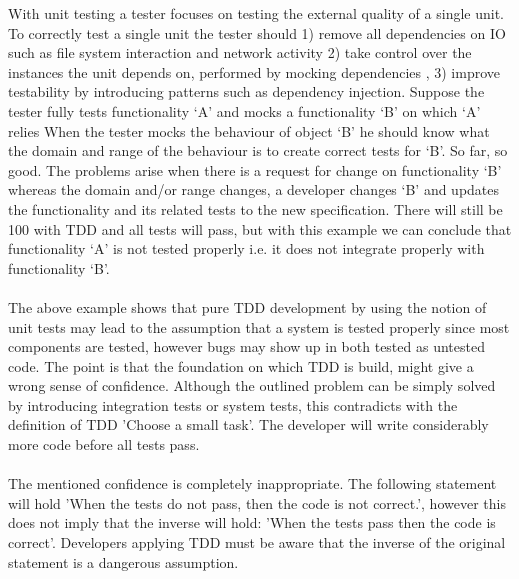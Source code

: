 \begin{itshape}
\begin{addmargin}[1em]{1em}
With unit testing a tester focuses on testing the external quality of a single unit. To correctly test a single unit
the tester should 1) remove all dependencies on IO such as file system interaction and network activity 2) take
control over the instances the unit depends on, performed by mocking dependencies \autocite{XP_EXAMINED}, 3) improve
testability by introducing patterns such as dependency injection. Suppose the
tester fully tests functionality `A' and mocks a functionality `B' on which `A' relies When the tester
mocks the behaviour of object `B' he should know what the domain and range of the behaviour is to create correct
tests for `B'. So far, so good. The problems arise when there is a request for change on functionality `B'
whereas the domain and/or range changes, a developer changes `B' and updates the functionality and its related
tests to the new specification. There will still be 100%
with TDD and all tests will pass, but with this example we can conclude that functionality `A' is not tested
properly i.e. it does not integrate properly with functionality `B'.
\end{addmargin}
\end{itshape}

\paragraph{}
The above example shows that pure TDD development by using the notion of unit tests may lead to the assumption that a
system is tested properly since most components are tested, however bugs may show up in both tested as untested code.
The point is that the foundation on which TDD is build, might give a wrong sense of confidence. Although the outlined
problem can be simply solved by introducing integration tests or system tests, this contradicts with the definition of
TDD 'Choose a small task'. The developer will write considerably more code before all tests pass.

\paragraph{}
The mentioned confidence is completely inappropriate. The following statement will hold 'When the tests do not
pass, then the code is not correct.', however this does not imply that the inverse will hold: 'When the tests
pass then the code is correct'. Developers applying TDD must be aware that the inverse of the original statement is a
dangerous assumption.


